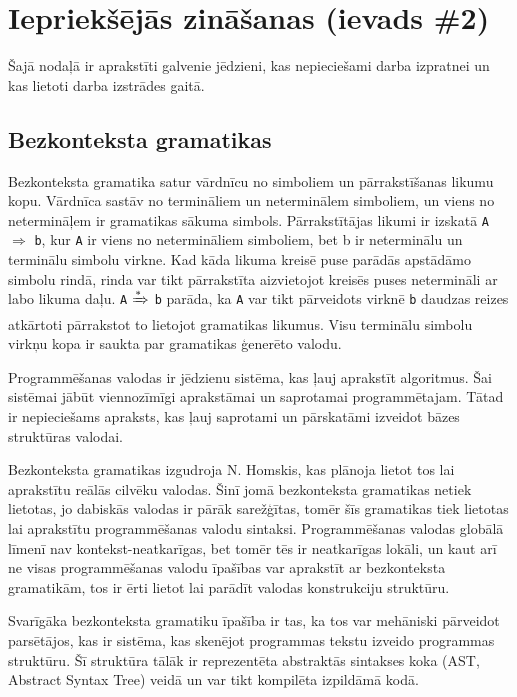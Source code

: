 \section{Iepriekšējās zināšanas (ievads \#2)}
Šajā nodaļā ir aprakstīti galvenie jēdzieni, kas nepieciešami darba izpratnei un kas lietoti darba izstrādes gaitā. 

\subsection{Bezkonteksta gramatikas}
Bezkonteksta gramatika satur vārdnīcu no simboliem un pārrakstīšanas likumu kopu. Vārdnīca sastāv no termināliem un neterminālem simboliem, un viens no netermināļem ir gramatikas sākuma simbols. Pārrakstītājas likumi ir izskatā \verb|A| $\Rightarrow$ \verb|b|, kur \verb|A| ir viens no netermināliem simboliem, bet b ir neterminālu un terminālu simbolu virkne. Kad kāda likuma kreisē puse parādās apstādāmo simbolu rindā, rinda var tikt pārrakstīta aizvietojot kreisēs puses netermināli ar labo likuma daļu. \verb|A| $\xRightarrow[]{*}$ \verb|b| parāda, ka \verb|A| var tikt pārveidots virknē \verb|b| daudzas reizes atkārtoti pārrakstot to lietojot gramatikas likumus. Visu terminālu simbolu virkņu kopa ir saukta par gramatikas ģenerēto valodu. \cite{Shutt:AdaptiveGrammars}

Programmēšanas valodas ir jēdzienu sistēma, kas ļauj aprakstīt algoritmus. Šai sistēmai jābūt viennozīmīgi aprakstāmai un saprotamai programmētajam. Tātad ir nepieciešams apraksts, kas ļauj saprotami un pārskatāmi izveidot bāzes struktūras valodai.

Bezkonteksta gramatikas izgudroja N. Homskis, kas plānoja lietot tos lai aprakstītu reālās cilvēku valodas. Šinī jomā bezkonteksta gramatikas netiek lietotas, jo dabiskās valodas ir pārāk sarežģītas, tomēr šīs gramatikas tiek lietotas lai aprakstītu programmēšanas valodu sintaksi. Programmēšanas valodas globālā līmenī nav kontekst-neatkarīgas, bet tomēr tēs ir neatkarīgas lokāli, un kaut arī ne visas programmēšanas valodu īpašības var aprakstīt ar bezkonteksta gramatikām, tos ir ērti lietot lai parādīt valodas konstrukciju struktūru.

Svarīgāka bezkonteksta gramatiku īpašība ir tas, ka tos var mehāniski pārveidot parsētājos, kas ir sistēma, kas skenējot programmas tekstu izveido programmas struktūru. Šī struktūra tālāk ir reprezentēta abstraktās sintakses koka (AST, Abstract Syntax Tree) veidā un  var tikt kompilēta izpildāmā kodā. \cite{Hopcroft:IntroAutomataTheory}

